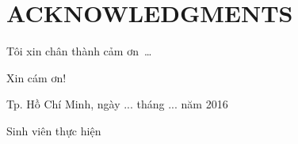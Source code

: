 \chapter*{ACKNOWLEDGMENTS}
\label{thanks}

Tôi xin chân thành cảm ơn~\ldots

Xin cám ơn!

\vspace{3cm}
\hspace{7cm}
\begin{minipage}[ht]{0.48\textwidth}
\begin{center}
Tp. Hồ Chí Minh, ngày ... tháng ... năm 2016

Sinh viên thực hiện

\tenSV  ~~~~~~~   \tenSVt 
\end{center}
\end{minipage}
